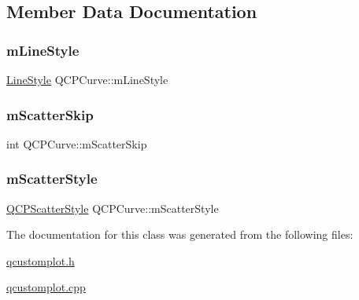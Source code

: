 \subsection{Member Data Documentation}
\mbox{\label{class_q_c_p_curve_ae1f35ae2b15aee8e15bcdfec5be95156}} 
\subsubsection{\texorpdfstring{m\+Line\+Style}{mLineStyle}}
{\footnotesize\ttfamily \hyperlink{class_q_c_p_curve_a2710e9f79302152cff794c6e16cc01f1}{Line\+Style} Q\+C\+P\+Curve\+::m\+Line\+Style\hspace{0.3cm}{\ttfamily [protected]}}

\mbox{\label{class_q_c_p_curve_a990bd5fdeb474459f3f6f5ad0a7b945c}} 
\subsubsection{\texorpdfstring{m\+Scatter\+Skip}{mScatterSkip}}
{\footnotesize\ttfamily int Q\+C\+P\+Curve\+::m\+Scatter\+Skip\hspace{0.3cm}{\ttfamily [protected]}}

\mbox{\label{class_q_c_p_curve_a08f803b4a30b01bbd7a1eab15d0f864f}} 
\subsubsection{\texorpdfstring{m\+Scatter\+Style}{mScatterStyle}}
{\footnotesize\ttfamily \hyperlink{class_q_c_p_scatter_style}{Q\+C\+P\+Scatter\+Style} Q\+C\+P\+Curve\+::m\+Scatter\+Style\hspace{0.3cm}{\ttfamily [protected]}}



The documentation for this class was generated from the following files\+:\begin{DoxyCompactItemize}
\item 
\hyperlink{qcustomplot_8h}{qcustomplot.\+h}\item 
\hyperlink{qcustomplot_8cpp}{qcustomplot.\+cpp}\end{DoxyCompactItemize}

